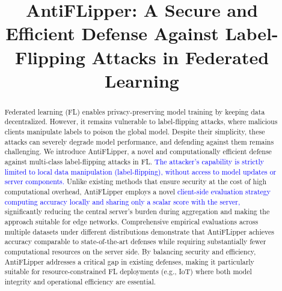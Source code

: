 \documentclass[conference]{IEEEtran}
\begin{document}
\title{AntiFLipper: A Secure and Efficient Defense Against Label-Flipping Attacks in Federated Learning}

\author{

}

\maketitle
\pagestyle{empty}

\begin{abstract}
Federated learning (FL) enables privacy-preserving model training by keeping data decentralized. However, it remains vulnerable to label-flipping attacks, where malicious clients manipulate labels to poison the global model. Despite their simplicity, these attacks can severely degrade model performance, and defending against them remains challenging. We introduce AntiFLipper, a novel and computationally efficient defense against multi-class label-flipping attacks in FL. \textcolor{blue}{The attacker's capability is strictly limited to local data manipulation (label-flipping), without access to model updates or server components.} Unlike existing methods that ensure security at the cost of high computational overhead, AntiFLipper employs a novel \textcolor{blue}{client-side evaluation strategy computing accuracy locally and sharing only a scalar score with the server,  }significantly reducing the central server's burden during aggregation and making the approach suitable for edge networks. Comprehensive empirical evaluations across multiple datasets under different distributions demonstrate that AntiFLipper achieves accuracy comparable to state-of-the-art defenses while requiring substantially fewer computational resources on the server side. By balancing security and efficiency, AntiFLipper addresses a critical gap in existing defenses, making it particularly suitable for resource-constrained FL deployments (e.g., IoT) where both model integrity and operational efficiency are essential.
\end{abstract}
\end{document}
